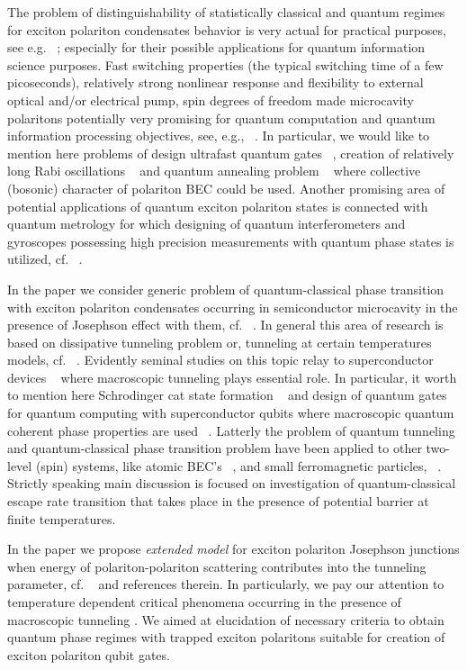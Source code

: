 \documentclass[aps,prl,preprint,groupedaddress]{revtex4-1}
\begin{document}
The problem of distinguishability of statistically classical and quantum regimes for exciton polariton condensates behavior is very actual for practical purposes, see e.g. ~\cite{19}; especially for their possible applications for quantum information science purposes. Fast switching properties (the typical switching time of a few picoseconds), relatively strong nonlinear response and flexibility to external optical and/or electrical pump, spin degrees of freedom  made  microcavity polaritons potentially very promising for quantum computation and quantum information processing objectives,  see, e.g., ~\cite{21,22,23}.  In particular, we would like to mention here problems of design ultrafast quantum gates ~\cite{22,23}, creation of relatively long Rabi oscillations ~\cite{19, 20} and quantum annealing problem ~\cite{24} where collective (bosonic) character of polariton BEC could be used. Another promising area of potential applications of quantum exciton polariton states is connected with quantum metrology for which   designing  of quantum interferometers and gyroscopes  possessing  high precision measurements with quantum phase states is utilized, cf. ~\cite{25, 26}.
  
In the paper we consider generic problem of quantum-classical phase transition with  exciton polariton condensates occurring in semiconductor  microcavity in the presence of Josephson effect with them, cf. ~\cite{27}. In general  this area of research is based on dissipative tunneling problem or, tunneling at certain temperatures models, cf. ~\cite{28,29,30}. Evidently seminal studies on this topic relay to superconductor devices ~\cite{31} where macroscopic tunneling plays essential role. In particular, it worth to mention here Schrodinger cat state formation ~\cite{32} and design of quantum gates for quantum computing with  superconductor qubits where macroscopic  quantum coherent phase properties are used ~\cite{33}. Latterly the problem of quantum tunneling and quantum-classical phase transition problem have been applied to other two-level (spin) systems, like atomic BEC’s ~\cite{34}, and small ferromagnetic particles, ~\cite{35}. Strictly speaking main discussion is focused on investigation of quantum-classical escape rate transition that takes place in the presence of potential barrier at finite temperatures.
  
In the paper we propose  \textit{extended  model} for exciton polariton  Josephson junctions when energy of polariton-polariton scattering contributes into the tunneling parameter,  cf. ~\cite{36,37,38} and references therein.  In particularly, we pay our attention to temperature dependent critical phenomena occurring in the presence of macroscopic tunneling  . We aimed at elucidation of necessary criteria  to obtain   quantum phase regimes with trapped exciton polaritons  suitable for creation of exciton polariton qubit gates.
\end{document}
